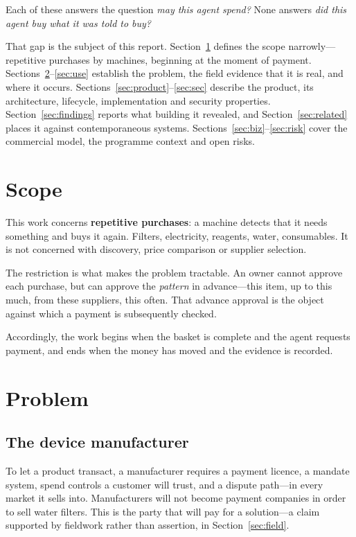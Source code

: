 \documentclass[journal,onecolumn,11pt]{IEEEtran}
\begin{document}
Each of these answers the question \emph{may this agent spend?} None answers
\emph{did this agent buy what it was told to buy?}

That gap is the subject of this report. Section~\ref{sec:scope} defines the scope
narrowly---repetitive purchases by machines, beginning at the moment of payment.
Sections~\ref{sec:pain}--\ref{sec:use} establish the problem, the field evidence that
it is real, and where it occurs. Sections~\ref{sec:product}--\ref{sec:sec} describe the
product, its architecture, lifecycle, implementation and security properties.
Section~\ref{sec:findings} reports what building it revealed, and
Section~\ref{sec:related} places it against contemporaneous systems.
Sections~\ref{sec:biz}--\ref{sec:risk} cover the commercial model, the programme
context and open risks.

\section{Scope}\label{sec:scope}
This work concerns \textbf{repetitive purchases}: a machine detects that it needs
something and buys it again. Filters, electricity, reagents, water, consumables. It is
not concerned with discovery, price comparison or supplier selection.

The restriction is what makes the problem tractable. An owner cannot approve each
purchase, but can approve the \emph{pattern} in advance---this item, up to this much,
from these suppliers, this often. That advance approval is the object against which a
payment is subsequently checked.

Accordingly, the work begins when the basket is complete and the agent requests
payment, and ends when the money has moved and the evidence is recorded.

\section{Problem}\label{sec:pain}

\subsection{The device manufacturer}
To let a product transact, a manufacturer requires a payment licence, a mandate
system, spend controls a customer will trust, and a dispute path---in every market it
sells into. Manufacturers will not become payment companies in order to sell water
filters. This is the party that will pay for a solution---a claim supported by
fieldwork rather than assertion, in Section~\ref{sec:field}.
\end{document}
